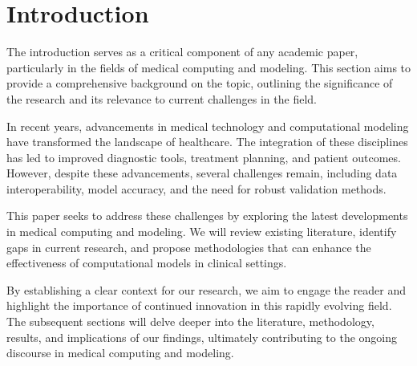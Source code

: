 

\section{Introduction}

The introduction serves as a critical component of any academic paper, particularly in the fields of medical computing and modeling. This section aims to provide a comprehensive background on the topic, outlining the significance of the research and its relevance to current challenges in the field.

In recent years, advancements in medical technology and computational modeling have transformed the landscape of healthcare. The integration of these disciplines has led to improved diagnostic tools, treatment planning, and patient outcomes. However, despite these advancements, several challenges remain, including data interoperability, model accuracy, and the need for robust validation methods.

This paper seeks to address these challenges by exploring the latest developments in medical computing and modeling. We will review existing literature, identify gaps in current research, and propose methodologies that can enhance the effectiveness of computational models in clinical settings.

By establishing a clear context for our research, we aim to engage the reader and highlight the importance of continued innovation in this rapidly evolving field. The subsequent sections will delve deeper into the literature, methodology, results, and implications of our findings, ultimately contributing to the ongoing discourse in medical computing and modeling.